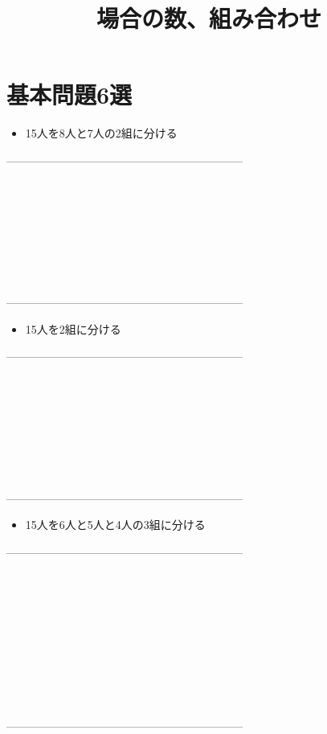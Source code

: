 \documentclass[twocolumn, 20pt]{jarticle}
\title{場合の数、組み合わせ}
\begin{document}
\columnseprule=0.2mm
\date{}
\maketitle
\section{基本問題6選}
\begin{itemize}
  \item 15人を8人と7人の2組に分ける
\end{itemize}
---------------------------------------------------------------
\\
\\
\\
\\
\\
\\
\\
\\
\\
---------------------------------------------------------------
\begin{itemize}
  \item 15人を2組に分ける
\end{itemize}
---------------------------------------------------------------
\\
\\
\\
\\
\\
\\
\\
\\
\\
---------------------------------------------------------------
\begin{itemize}
  \item 15人を6人と5人と4人の3組に分ける
\end{itemize}
---------------------------------------------------------------
\\
\\
\\
\\
\\
\\
\\
\\
\\
\\
\\
---------------------------------------------------------------
\end{document}
